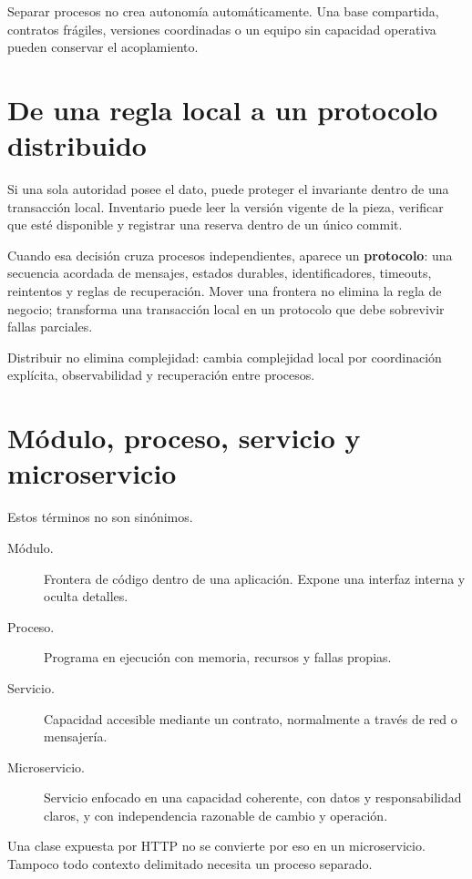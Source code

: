\documentclass[variant=apuntes,cover=institutional,mode=screen]{ua-engineering-v6-article}
\begin{document}
Separar procesos no crea autonomía automáticamente. Una base compartida, contratos frágiles, versiones coordinadas o un equipo sin capacidad operativa pueden conservar el acoplamiento.

\section{De una regla local a un protocolo distribuido}

Si una sola autoridad posee el dato, puede proteger el invariante dentro de una transacción local. Inventario puede leer la versión vigente de la pieza, verificar que esté disponible y registrar una reserva dentro de un único commit.

Cuando esa decisión cruza procesos independientes, aparece un \textbf{protocolo}: una secuencia acordada de mensajes, estados durables, identificadores, timeouts, reintentos y reglas de recuperación. Mover una frontera no elimina la regla de negocio; transforma una transacción local en un protocolo que debe sobrevivir fallas parciales.

\begin{uakeybox}
Distribuir no elimina complejidad: cambia complejidad local por coordinación explícita, observabilidad y recuperación entre procesos.
\end{uakeybox}

\section{Módulo, proceso, servicio y microservicio}

Estos términos no son sinónimos.

\begin{description}
\item[Módulo.] Frontera de código dentro de una aplicación. Expone una interfaz interna y oculta detalles.
\item[Proceso.] Programa en ejecución con memoria, recursos y fallas propias.
\item[Servicio.] Capacidad accesible mediante un contrato, normalmente a través de red o mensajería.
\item[Microservicio.] Servicio enfocado en una capacidad coherente, con datos y responsabilidad claros, y con independencia razonable de cambio y operación.
\end{description}

Una clase expuesta por HTTP no se convierte por eso en un microservicio. Tampoco todo contexto delimitado necesita un proceso separado.
\end{document}
